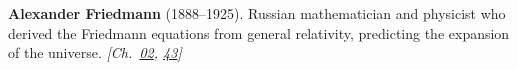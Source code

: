 \textbf{Alexander Friedmann} (1888–1925). Russian mathematician and physicist who derived the Friedmann equations from general relativity, predicting the expansion of the universe. \emph{[Ch.~\hyperref[ch:acceleratinguniverse]{02}, \hyperref[ch:nearflatuniverse]{43}]}


